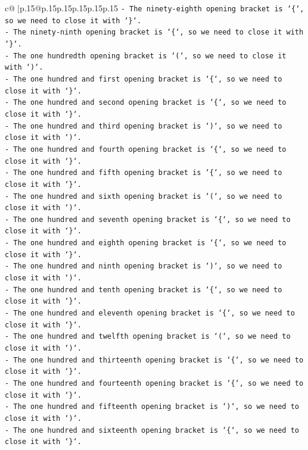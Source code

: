 \documentclass{article}
\begin{document}
{\begin{supertabular}{c@{$\;$}|p{.15\linewidth}@{}p{.15\linewidth}p{.15\linewidth}p{.15\linewidth}p{.15\linewidth}p{.15\linewidth}}
{{{\texttt{{-} The ninety{-}eighth opening bracket is `\{`, so we need to close it with `\}`.} \\
\texttt{{-} The ninety{-}ninth opening bracket is `\{`, so we need to close it with `\}`.} \\
\texttt{{-} The one hundredth opening bracket is `(`, so we need to close it with `)`.} \\
\texttt{{-} The one hundred and first opening bracket is `\{`, so we need to close it with `\}`.} \\
\texttt{{-} The one hundred and second opening bracket is `\{`, so we need to close it with `\}`.} \\
\texttt{{-} The one hundred and third opening bracket is `)`, so we need to close it with `)`.} \\
\texttt{{-} The one hundred and fourth opening bracket is `\{`, so we need to close it with `\}`.} \\
\texttt{{-} The one hundred and fifth opening bracket is `\{`, so we need to close it with `\}`.} \\
\texttt{{-} The one hundred and sixth opening bracket is `(`, so we need to close it with `)`.} \\
\texttt{{-} The one hundred and seventh opening bracket is `\{`, so we need to close it with `\}`.} \\
\texttt{{-} The one hundred and eighth opening bracket is `\{`, so we need to close it with `\}`.} \\
\texttt{{-} The one hundred and ninth opening bracket is `)`, so we need to close it with `)`.} \\
\texttt{{-} The one hundred and tenth opening bracket is `\{`, so we need to close it with `\}`.} \\
\texttt{{-} The one hundred and eleventh opening bracket is `\{`, so we need to close it with `\}`.} \\
\texttt{{-} The one hundred and twelfth opening bracket is `(`, so we need to close it with `)`.} \\
\texttt{{-} The one hundred and thirteenth opening bracket is `\{`, so we need to close it with `\}`.} \\
\texttt{{-} The one hundred and fourteenth opening bracket is `\{`, so we need to close it with `\}`.} \\
\texttt{{-} The one hundred and fifteenth opening bracket is `)`, so we need to close it with `)`.} \\
\texttt{{-} The one hundred and sixteenth opening bracket is `\{`, so we need to close it with `\}`.} \\
}}}
\end{supertabular}}
\end{document}
